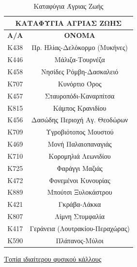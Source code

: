 \documentclass[12pt]{article}
\begin{document}
	\begin{table}[H]
		\centering
		\begin{tabular}{|c|c|}
			\hline
			\multicolumn{2}{|c|}{\textbf{ΚΑΤΑΦΥΓΙΑ ΑΓΡΙΑΣ ΖΩΗΣ}} \\ \hline
			\textbf{Α/Α} & \textbf{ΟΝΟΜΑ} \\ \hline
			Κ438 & Πρ. Ηλίας-Δελόκορμο (Μυκήνες) \\ \hline
			Κ446 & Μάλιζα-Τουρνέζα \\ \hline
			Κ458 & Νησίδες Ρόμβη-Δασκαλειό \\ \hline
			Κ707 & Κυνόρτιο  Όρος \\ \hline
			Κ457 & Σταυροπόδι-Καναρπίτσα \\ \hline
			Κ815 & Κάμπος Κρανιδίου \\ \hline
			Κ456 & Δασώδης Περιοχή Αγ. Θεοδώρων \\ \hline
			Κ709 & Υγροβιότοπος Μουστού \\ \hline
			Κ469 & Μονή Παλαιοπαναγιάς \\ \hline
			Κ710 & Κορομηλιά Λεωνιδίου \\ \hline
			Κ725 & Φαράγγι Μαζιάς \\ \hline
			Κ472 & Φονεμένοι Κυνουρίας \\ \hline
			Κ889 & Μπούτσι Ξυλοκάστρου \\ \hline
			Κ421 & Γκράβα-Λάκκα \\ \hline
			Κ807 & Λίμνη Στυμφαλία \\ \hline
			Κ417 & Γεράνεια (Λουτρακίου-Περαχώρας) \\ \hline
			Κ590 & Πλάτανος-Μύλοι \\ \hline
		\end{tabular}
		\caption{Καταφύγια Άγριας Ζωής}
	\label{The label}
	\end{table}

	\underline{Τοπία ιδιαίτερου φυσικού κάλλους}
	
\end{document}
